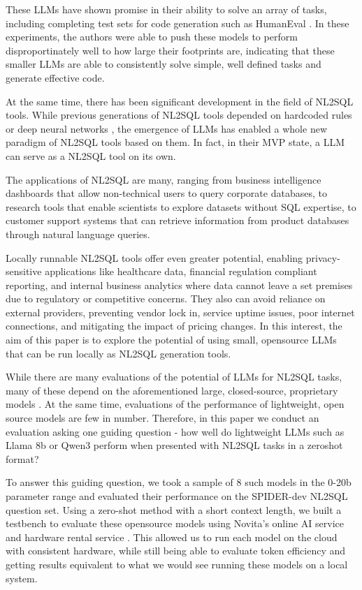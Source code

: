 \documentclass[sigconf]{acmart}
\begin{document}
These LLMs have shown promise in their ability to solve an array of tasks, including completing test sets for code 
generation such as HumanEval \cite{hasan2025smallcode}\cite{corradini2025slmsurvey}. In these experiments, the authors
were able to push these models to perform disproportinately well to how large their footprints are, indicating that 
these smaller LLMs are able to consistently solve simple, well defined tasks and generate effective code.

At the same time, there has been significant development in the field of NL2SQL tools. While previous generations of 
NL2SQL tools depended on hardcoded rules or deep neural networks \cite{nl2sqlsurvey}, the emergence of LLMs has enabled
a whole new paradigm of NL2SQL tools based on them. In fact, in their MVP state, a LLM can serve as a NL2SQL tool
on its own. 

The applications of NL2SQL are many, ranging from business intelligence dashboards that allow non-technical users to 
query corporate databases, to research tools that enable scientists to explore datasets without SQL expertise, to 
customer support systems that can retrieve information from product databases through natural language queries. 

Locally runnable NL2SQL tools offer even greater potential, enabling privacy-sensitive applications like healthcare data, 
financial regulation compliant reporting, and internal business analytics where data cannot leave a set premises
due to regulatory or competitive concerns. They also can avoid reliance on external providers,
preventing vendor lock in, service uptime issues, poor internet connections, and mitigating the impact of pricing changes.
In this interest, the aim of this paper is to explore the potential of using small, opensource LLMs that can be run 
locally as NL2SQL generation tools. 

While there are many evaluations of the potential of LLMs for NL2SQL tasks, many of these depend on the aforementioned
large, closed-source, proprietary models \cite{pei2025feather_sql}\cite{nl2sqlsurvey}\cite{liu2024survey_nl2sql}. At the same 
time, evaluations of the performance of lightweight, open source models are few in number. Therefore, in this paper we
conduct an evaluation asking one guiding question - how well do lightweight LLMs such as Llama 8b or Qwen3 perform when 
presented with NL2SQL tasks in a zeroshot format? 

To answer this guiding question, we took a sample of 8 such models in the 0-20b parameter range and evaluated their 
performance on the SPIDER-dev NL2SQL question set. Using a zero-shot method with a short context length, we built a 
testbench\cite{sourceCode} to evaluate these opensource models using Novita's online AI service and hardware rental service \cite{novitaAI}.
This allowed us to run each model on the cloud with consistent hardware, while still being able to evaluate token efficiency
and getting results equivalent to what we would see running these models on a local system.
\end{document}
